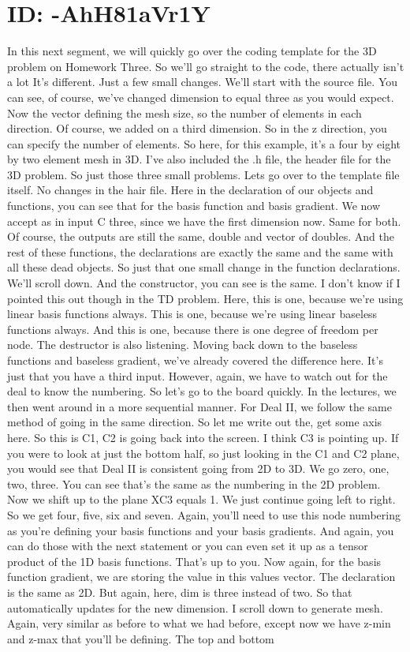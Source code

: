 \documentclass[10pt]{article}
\begin{document}
\section*{ID: -AhH81aVr1Y}
In this next segment, we will quickly go over the coding template for the 3D problem on Homework Three. So we'll go straight to the code, there actually isn't a lot It's different. Just a few small changes. We'll start with the source file. You can see, of course, we've changed dimension to equal three as you would expect. Now the vector defining the mesh size, so the number of elements in each direction. Of course, we added on a third dimension. So in the z direction, you can specify the number of elements. So here, for this example, it's a four by eight by two element mesh in 3D. I've also included the .h file, the header file for the 3D problem. So just those three small problems. Lets go over to the template file itself. No changes in the hair file. Here in the declaration of our objects and functions, you can see that for the basis function and basis gradient. We now accept as in input C three, since we have the first dimension now. Same for both. Of course, the outputs are still the same, double and vector of doubles. And the rest of these functions, the declarations are exactly the same and the same with all these dead objects. So just that one small change in the function declarations. We'll scroll down. And the constructor, you can see is the same. I don't know if I pointed this out though in the TD problem. Here, this is one, because we're using linear basis functions always. This is one, because we're using linear baseless functions always. And this is one, because there is one degree of freedom per node. The destructor is also listening. Moving back down to the baseless functions and baseless gradient, we've already covered the difference here. It's just that you have a third input. However, again, we have to watch out for the deal to know the numbering. So let's go to the board quickly. In the lectures, we then went around in a more sequential manner. For Deal II, we follow the same method of going in the same direction. So let me write out the, get some axis here. So this is C1, C2 is going back into the screen. I think C3 is pointing up. If you were to look at just the bottom half, so just looking in the C1 and C2 plane, you would see that Deal II is consistent going from 2D to 3D. We go zero, one, two, three. You can see that's the same as the numbering in the 2D problem. Now we shift up to the plane XC3 equals 1. We just continue going left to right. So we get four, five, six and seven. Again, you'll need to use this node numbering as you're defining your basis functions and your basis gradients. And again, you can do those with the next statement or you can even set it up as a tensor product of the 1D basis functions. That's up to you.  Now again, for the basis function gradient, we are storing the value in this values vector. The declaration is the same as 2D. But again, here, dim is three instead of two. So that automatically updates for the new dimension. I scroll down to generate mesh. Again, very similar as before to what we had before, except now we have z-min and z-max that you'll be defining. The top and bottom 
\end{document}
